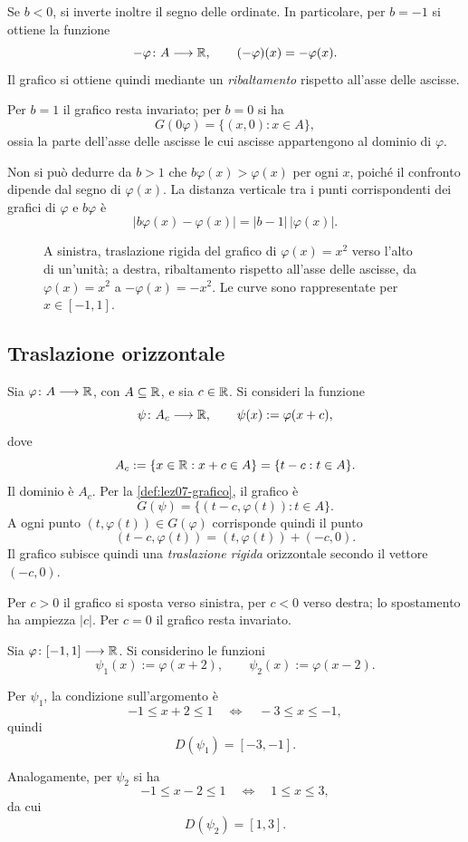 Se \(b<0\), si inverte inoltre il segno delle
ordinate. In particolare, per \(b=-1\) si ottiene
la funzione
\[
  -\varphi\colon A\longrightarrow\mathbb{R},
  \qquad
  (-\varphi)(x)=-\varphi(x).
\]
Il grafico si ottiene quindi mediante un
\emph{ribaltamento} rispetto all'asse delle ascisse.

Per \(b=1\) il grafico resta invariato; per \(b=0\) si ha
\[
  G(0\varphi)=\{(x,0):x\in A\},
\]
ossia la parte dell'asse delle ascisse le cui
ascisse appartengono al dominio di \(\varphi\).

Non si può dedurre da \(b>1\) che
\(b\varphi(x)>\varphi(x)\) per ogni \(x\), poiché
il confronto dipende dal segno di \(\varphi(x)\).
La distanza verticale tra i punti corrispondenti
dei grafici di \(\varphi\) e \(b\varphi\) è
\[
  |b\varphi(x)-\varphi(x)|
  =|b-1|\,|\varphi(x)|.
\]

\begin{figure}[htbp]
  \centering
  
  \caption{A sinistra, traslazione rigida del
  grafico di \(\varphi(x)=x^2\) verso l'alto di
  un'unità; a destra, ribaltamento rispetto
  all'asse delle ascisse, da \(\varphi(x)=x^2\)
  a \(-\varphi(x)=-x^2\). Le curve sono
  rappresentate per \(x\in[-1,1]\).}
  \label{fig:lez07-verticali}
\end{figure}

\subsection{Traslazione orizzontale}
\label{sec:lez07-traslazioni-orizzontali}

Sia \(\varphi\colon A\longrightarrow\mathbb{R}\), con
\(A\subseteq\mathbb{R}\), e sia \(c\in\mathbb{R}\). Si consideri
la funzione
\[
  \psi\colon A_c\longrightarrow\mathbb{R},
  \qquad
  \psi(x):=\varphi(x+c),
\]
dove
\[
  A_c:=\{x\in\mathbb{R}:x+c\in A\}
      =\{t-c:t\in A\}.
\]
Il dominio è \(A_c\). Per la \cref{def:lez07-grafico},
il grafico è
\[
  G(\psi)=\{(t-c,\varphi(t)):t\in A\}.
\]
A ogni punto \((t,\varphi(t))\in G(\varphi)\)
corrisponde quindi il punto
\[
  (t-c,\varphi(t))
  =(t,\varphi(t))+(-c,0).
\]
Il grafico subisce quindi una \emph{traslazione rigida}
orizzontale secondo il vettore \((-c,0)\).

Per \(c>0\) il grafico si sposta verso sinistra,
per \(c<0\) verso destra; lo spostamento ha
ampiezza \(|c|\). Per \(c=0\) il grafico resta invariato.

\begin{example}
\label{ex:lez07-dominio-traslato}
Sia \(\varphi\colon[-1,1]\longrightarrow\mathbb{R}\).
Si considerino le funzioni
\[
  \psi_1(x):=\varphi(x+2),
  \qquad
  \psi_2(x):=\varphi(x-2).
\]

Per \(\psi_1\), la condizione sull'argomento è
\[
  -1\le x+2\le1
  \quad\Longleftrightarrow\quad
  -3\le x\le-1,
\]
quindi
\[
  D(\psi_1)=[-3,-1].
\]

Analogamente, per \(\psi_2\) si ha
\[
  -1\le x-2\le1
  \quad\Longleftrightarrow\quad
  1\le x\le3,
\]
da cui
\[
  D(\psi_2)=[1,3].
\]
\end{example}

